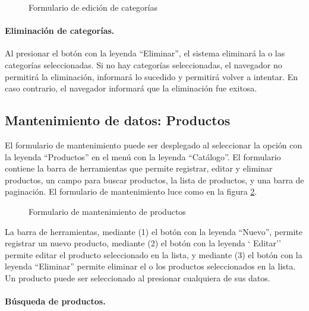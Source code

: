 \documentclass[a4paper, 9pt, conference]{article}              %
\begin{document}
\begin{figure}
	\centering
		\caption{Formulario de edici\'on de categor\'ias}
	\label{fig:catalogcategoriesedit}
\end{figure}

\paragraph{Eliminaci\'on de categor\'ias.}

Al presionar el bot\'on con la leyenda ``Eliminar'', el sistema eliminar\'a la o las categor\'ias seleccionadas. Si no hay categor\'ias seleccionadas, el navegador no permitir\'a la eliminaci\'on, informar\'a lo sucedido y permitir\'a volver a intentar. En caso contrario, el navegador informar\'a que la eliminaci\'on fue exitosa.

\subsection{Mantenimiento de datos: Productos}

El formulario de mantenimiento puede ser desplegado al seleccionar la opci\'on con la leyenda ``Productos'' en el men\'u con la leyenda ``Cat\'alogo''. El formulario contiene la barra de herramientas que permite registrar, editar y eliminar productos, un campo para buscar productos, la lista de productos, y una barra de paginaci\'on. El formulario de mantenimiento luce como en la figura \ref{fig:catalogproducts}.

\begin{figure}
	\centering
		\caption{Formulario de mantenimiento de productos}
	\label{fig:catalogproducts}
\end{figure}

La barra de herramientas, mediante (1) el bot\'on con la leyenda ``Nuevo'', permite registrar un nuevo producto, mediante (2) el bot\'on con la leyenda ` Editar'' permite editar el producto seleccionado en la lista, y mediante (3) el bot\'on con la leyenda ``Eliminar'' permite eliminar el o los productos seleccionados en la lista. Un producto puede ser seleccionado al presionar cualquiera de sus datos.

\paragraph{B\'usqueda de productos.}
\end{document}
